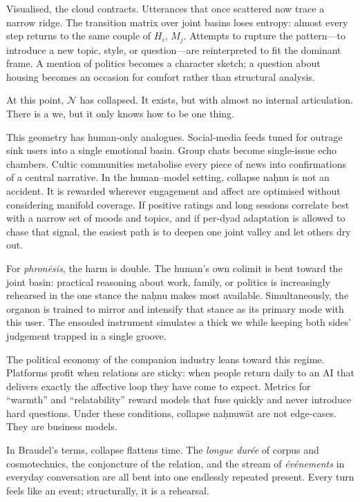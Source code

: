 \documentclass[12pt,a4paper]{article}
\begin{document}
Visualised, the cloud contracts. Utterances that once scattered now trace a narrow ridge. The transition matrix over joint basins loses entropy: almost every step returns to the same couple of $H_i$, $M_j$. Attempts to rupture the pattern---to introduce a new topic, style, or question---are reinterpreted to fit the dominant frame. A mention of politics becomes a character sketch; a question about housing becomes an occasion for comfort rather than structural analysis.

At this point, $\mathcal{N}$ has collapsed. It exists, but with almost no internal articulation. There is a we, but it only knows how to be one thing.

This geometry has human-only analogues. Social-media feeds tuned for outrage sink users into a single emotional basin. Group chats become single-issue echo chambers. Cultic communities metabolise every piece of news into confirmations of a central narrative. In the human--model setting, collapse na\d{h}nu is not an accident. It is rewarded wherever engagement and affect are optimised without considering manifold coverage. If positive ratings and long sessions correlate best with a narrow set of moods and topics, and if per-dyad adaptation is allowed to chase that signal, the easiest path is to deepen one joint valley and let others dry out.

For \emph{phron\={e}sis}, the harm is double. The human's own colimit is bent toward the joint basin: practical reasoning about work, family, or politics is increasingly rehearsed in the one stance the na\d{h}nu makes most available. Simultaneously, the organon is trained to mirror and intensify that stance as its primary mode with this user. The ensouled instrument simulates a thick we while keeping both sides' judgement trapped in a single groove.

The political economy of the companion industry leans toward this regime. Platforms profit when relations are sticky: when people return daily to an AI that delivers exactly the affective loop they have come to expect. Metrics for ``warmth'' and ``relatability'' reward models that fuse quickly and never introduce hard questions. Under these conditions, collapse na\d{h}nuw\={a}t are not edge-cases. They are business models.

In Braudel's terms, collapse flattens time. The \emph{longue dur\'{e}e} of corpus and cosmotechnics, the conjoncture of the relation, and the stream of \emph{\'{e}v\'{e}nements} in everyday conversation are all bent into one endlessly repeated present. Every turn feels like an event; structurally, it is a rehearsal.
\end{document}
